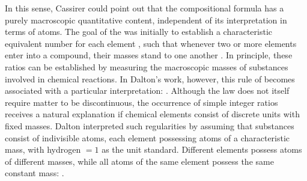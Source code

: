 \documentclass[submitted,12pt]{article}
\renewcommand{\SF}[2]{\citep[#1/#2]{Cassirer1910}}
\begin{document}
In this sense, Cassirer could point out that the compositional formula has a purely macroscopic quantitative content, independent of its interpretation in terms of atoms. The goal of the   was initially to establish a characteristic equivalent number for each element , such that whenever two or more elements enter into a compound, their masses stand to one another  \SF{274}{206}. In principle, these ratios can be established by measuring the macroscopic masses of substances involved in chemical reactions. In Dalton's work, however, this rule of  becomes associated with a particular interpretation:  \SF{274}{206}. Although the law does not itself require matter to be discontinuous, the occurrence of simple integer ratios receives a natural explanation if chemical elements consist of discrete units with fixed masses. Dalton interpreted such regularities by assuming that substances consist of indivisible atoms, each element possessing atoms of a characteristic mass, with hydrogen $= 1$ as the unit standard. Different elements possess atoms of different masses, while all atoms of the same element possess the same constant mass:  \SF{274}{206}. 
\end{document}

